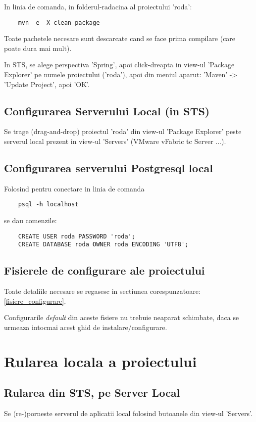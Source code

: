 In linia de comanda, in folderul-radacina al proiectului 'roda':
\begin{lstlisting}
	mvn -e -X clean package
\end{lstlisting}

Toate pachetele necesare sunt descarcate cand se face prima compilare (care poate dura mai mult).

In STS, se alege perspectiva 'Spring', apoi click-dreapta in view-ul 'Package
Explorer' pe numele proiectului ('roda'), apoi din meniul aparut:
'Maven' -> 'Update Project', apoi 'OK'.


\subsection{Configurarea Serverului Local (in STS)}
Se trage (drag-and-drop) proiectul 'roda' din view-ul 'Package Explorer' 
peste serverul local prezent in view-ul 'Servers' (VMware vFabric tc Server ...).

\subsection{Configurarea serverului Postgresql local}
Folosind pentru conectare in linia de comanda
\begin{lstlisting}
	psql -h localhost
\end{lstlisting}
se dau comenzile:
\begin{lstlisting}
	CREATE USER roda PASSWORD 'roda';
	CREATE DATABASE roda OWNER roda ENCODING 'UTF8';
\end{lstlisting}

\subsection{Fisierele de configurare ale proiectului}
Toate detaliile necesare se regasesc in sectiunea
corespunzatoare: \ref{fisiere_configurare}.

Configurarile \emph{default} din aceste fisiere nu trebuie neaparat
schimbate, daca se urmeaza intocmai acest ghid de instalare/configurare.

\section{Rularea locala a proiectului}

\subsection{Rularea din STS, pe Server Local}
Se (re-)porneste serverul de aplicatii local folosind butoanele din view-ul
'Servers'.

